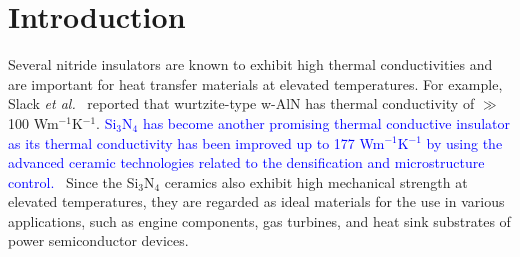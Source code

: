 \documentclass[twocolumn,amsmath,amssymb,a4paper,prb,superscriptaddress,floatfix]{revtex4-1}
\begin{document}
\maketitle

\section{Introduction}
Several nitride insulators are known to exhibit high thermal conductivities and
are important for heat transfer materials at elevated temperatures. For
example, Slack {\it et al.}~\cite{slack} reported that wurtzite-type w-AlN has
thermal conductivity of $\gg$  100 Wm$^{-1}$K$^{-1}$. \textcolor{blue}{Si$_3$N$_4$ has become
another promising thermal conductive insulator as its thermal conductivity has
been improved up to 177 Wm$^{-1}$K$^{-1}$ by using the advanced ceramic
technologies related to the densification and microstructure
control.~\cite{zhou,hirao-rev,watari,hirosaki}} Since the Si$_3$N$_4$ ceramics also
exhibit high mechanical strength at elevated temperatures, they are
regarded as ideal materials for the use in various applications, such as
engine components, gas turbines, and heat sink substrates of power
semiconductor devices.
\end{document}
